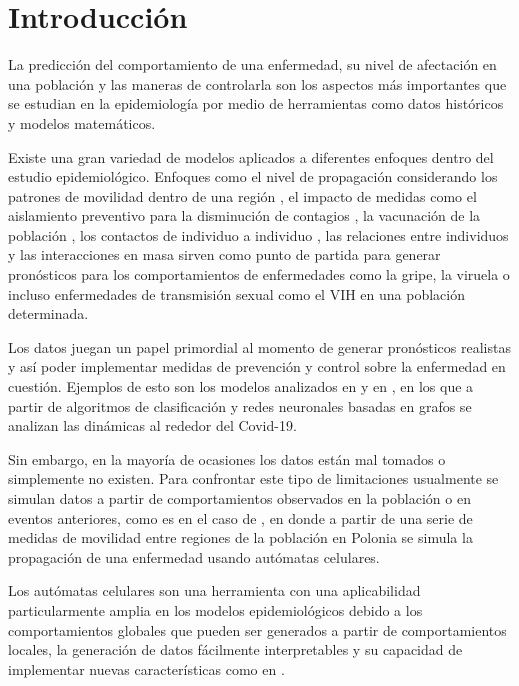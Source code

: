 \chapter{Introducción}\label{ch;Introduccion}

La predicción del comportamiento de una enfermedad, su nivel de afectación en una población y las maneras de controlarla son los aspectos más importantes que se estudian en la epidemiología por medio de herramientas como datos históricos y modelos matemáticos.

Existe una gran variedad de modelos aplicados a diferentes enfoques dentro del estudio epidemiológico. Enfoques como el nivel de propagación considerando los patrones de movilidad dentro de una región \cite{colaGNN, epidemiologicalNeuralNetwork}, el impacto de medidas como el aislamiento preventivo para la disminución de contagios \cite{stayHome}, la vacunación de la población \cite{shortHistory}, los contactos de individuo a individuo \cite{heterogeneousPopulation}, las relaciones entre individuos \cite{redesComplejas} y las interacciones en masa \cite{combiningGraph, transfer2021} sirven como punto de partida para generar pronósticos para los comportamientos de enfermedades como la gripe, la viruela o incluso enfermedades de transmisión sexual como el VIH en una población determinada.

Los datos juegan un papel primordial al momento de generar pronósticos realistas y así poder implementar medidas de prevención y control sobre la enfermedad en cuestión. Ejemplos de esto son los modelos analizados en \cite{epidemiologicalNeuralNetwork, combiningGraph, forecasting} y en \cite{transfer2021}, en los que a partir de algoritmos de clasificación y redes neuronales basadas en grafos se analizan las dinámicas al rededor del Covid-19.

Sin embargo, en la mayoría de ocasiones los datos están mal tomados o simplemente no existen. Para confrontar este tipo de limitaciones usualmente se simulan datos a partir de comportamientos observados en la población o en eventos anteriores, como es en el caso de \cite{populationDensity}, en donde a partir de una serie de medidas de movilidad entre regiones de la población en Polonia se simula la propagación de una enfermedad usando autómatas celulares.

Los autómatas celulares son una herramienta con una aplicabilidad particularmente amplia en los modelos epidemiológicos debido a los comportamientos globales que pueden ser generados a partir de comportamientos locales, la generación de datos fácilmente interpretables y su capacidad de implementar nuevas características como en \cite{spatialDependences, populationDensity, globalStochastic}.

